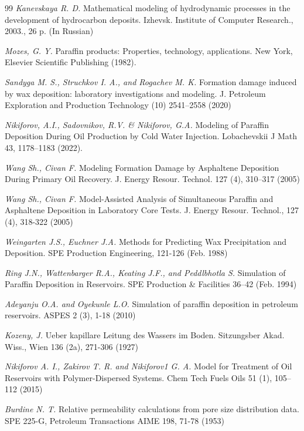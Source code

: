 \documentclass[12pt,twoside,a4paper]{uz_ku}
\begin{document}
\begin{thebibliography}{99}
\textit {Kanevskaya R. D.} Mathematical modeling of hydrodynamic processes in the development of hydrocarbon deposits. Izhevsk. Institute of Computer Research., 2003., 26 p. (In Russian)

\textit {Mozes, G. Y.} Paraffin products: Properties, technology, applications. New York, Elsevier Scientific Publishing (1982).

\textit {Sandyga M. S., Struchkov I. A., and Rogachev M. K.} Formation damage induced by wax deposition: laboratory investigations and modeling. J. Petroleum Exploration and Production Technology (10) 2541–2558 (2020) 

\textit {Nikiforov, A.I., Sadovnikov, R.V. \& Nikiforov, G.A.} Modeling of Paraffin Deposition During Oil Production by Cold Water Injection. Lobachevskii J Math 43, 1178–1183 (2022).

\textit {Wang Sh., Civan F.} Modeling Formation Damage by Asphaltene Deposition During Primary Oil Recovery. J. Energy Resour. Technol. 127 (4), 310–317 (2005) 

\textit {Wang Sh., Civan F.} Model-Assisted Analysis of Simultaneous Paraffin and Asphaltene Deposition in Laboratory Core Tests. J. Energy Resour. Technol., 127 (4), 318-322 (2005) 

\textit {Weingarten J.S., Euchner J.A.} Methods for Predicting Wax Precipitation and Deposition. SPE Production Engineering, 121-126 (Feb. 1988) 

\textit {Ring J.N., Wattenbarger R.A., Keating J.F., and Peddlbhotla S.} Simulation of Paraffin Deposition in Reservoirs. SPE Production \& Facilities 36–42 (Feb. 1994) 

\textit {Adeyanju O.A. and Oyekunle L.O.} Simulation of paraffin deposition in petroleum reservoirs. ASPES 2 (3), 1-18 (2010) 

\textit {Kozeny, J.} Ueber kapillare Leitung des Wassers im Boden. Sitzungsber Akad. Wiss., Wien 136 (2a), 271-306 (1927)

\textit {Nikiforov A. I., Zakirov T. R. and Nikiforov1 G. A.} Model for Treatment of Oil Reservoirs with Polymer-Dispersed Systems. Chem Tech Fuels Oils 51 (1), 105–112 (2015) 

\textit {Burdine N. T.} Relative permeability calculations from pore size distribution data. SPE 225-G, Petroleum Transactions AIME 198, 71-78 (1953) 


\end{thebibliography}
\end{document}
